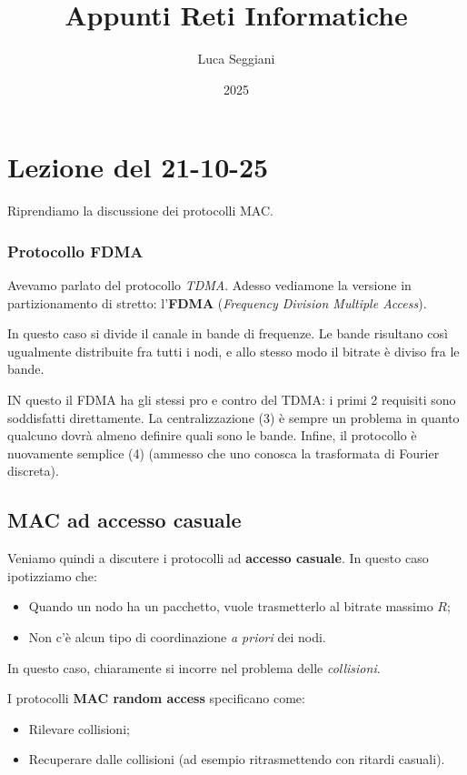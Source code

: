 \documentclass[a4paper,11pt]{article}
\title{Appunti Reti Informatiche}
\author{Luca Seggiani}
\date{2025}
\begin{document}
\section{Lezione del 21-10-25}

\thispagestyle{empty}
\pagestyle{fancy}

Riprendiamo la discussione dei protocolli MAC.

\subsubsection{Protocollo FDMA}
Avevamo parlato del protocollo \textit{TDMA}. Adesso vediamone la versione in partizionamento di stretto: l'\textbf{FDMA} (\textit{Frequency Division Multiple Access}).

In questo caso si divide il canale in bande di frequenze. Le bande risultano così ugualmente distribuite fra tutti i nodi, e allo stesso modo il bitrate è diviso fra le bande.

IN questo il FDMA ha gli stessi pro e contro del TDMA: i primi 2 requisiti sono soddisfatti direttamente. La centralizzazione (3) è sempre un problema in quanto qualcuno dovrà almeno definire quali sono le bande. Infine, il protocollo è nuovamente semplice (4) (ammesso che uno conosca la trasformata di Fourier discreta). 

\subsection{MAC ad accesso casuale}
Veniamo quindi a discutere i protocolli ad \textbf{accesso casuale}.
In questo caso ipotizziamo che:
\begin{itemize}
	\item Quando un nodo ha un pacchetto, vuole trasmetterlo al bitrate massimo $R$;
	\item Non c'è alcun tipo di coordinazione \textit{a priori} dei nodi.
\end{itemize}

In questo caso, chiaramente si incorre nel problema delle \textit{collisioni}.

I protocolli \textbf{MAC random access} specificano come:
\begin{itemize}
	\item Rilevare collisioni;
	\item Recuperare dalle collisioni (ad esempio ritrasmettendo con ritardi casuali).
\end{itemize}
\end{document}

